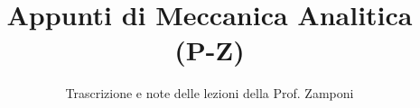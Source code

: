 \documentclass[a4paper,12pt]{article}
\title{Appunti di Meccanica Analitica (P-Z)}
\author{Trascrizione e note delle lezioni della Prof. Zamponi}
\date{}
\begin{document}
\maketitle
\projectintro
\tableofcontents
\newpage

\end{document}
